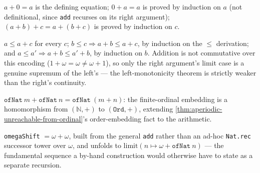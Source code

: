 \begin{theorem}\label{thm:ord-add-assoc}\leanok{}
$a+0=a$ is the defining equation; $0+a=a$ is proved by induction on $a$ (not definitional,
since \texttt{add} recurses on its right argument); $(a+b)+c=a+(b+c)$ is proved by induction
on $c$.
\end{theorem}

\begin{theorem}\label{thm:ord-add-mono}\leanok{}
$a \le a+c$ for every $c$; $b\le c \Rightarrow a+b\le a+c$, by induction on the $\le$
derivation; and $a\le a' \Rightarrow a+b\le a'+b$, by induction on $b$. Addition is not
commutative over this encoding ($1+\omega=\omega\ne\omega+1$), so only the right argument's
limit case is a genuine supremum of the left's --- the left-monotonicity theorem is strictly
weaker than the right's continuity.
\end{theorem}

\begin{theorem}\label{thm:ord-add-ofnat}\leanok{}
$\texttt{ofNat}\ m + \texttt{ofNat}\ n = \texttt{ofNat}\ (m+n)$: the finite-ordinal embedding is
a homomorphism from $(\mathbb N,+)$ to $(\texttt{Ord},+)$, extending
\cref{thm:aperiodic-unreachable-from-ordinal}'s order-embedding fact to the arithmetic.
\end{theorem}

\begin{theorem}\label{thm:ord-omega-shift}\leanok{}
\texttt{omegaShift} $=\omega+\omega$, built from the general \texttt{add} rather than an
ad-hoc \texttt{Nat.rec} successor tower over $\omega$, and unfolds to
$\mathrm{limit}(n\mapsto \omega + \texttt{ofNat}\ n)$ --- the fundamental sequence a by-hand
construction would otherwise have to state as a separate recursion.
\end{theorem}

